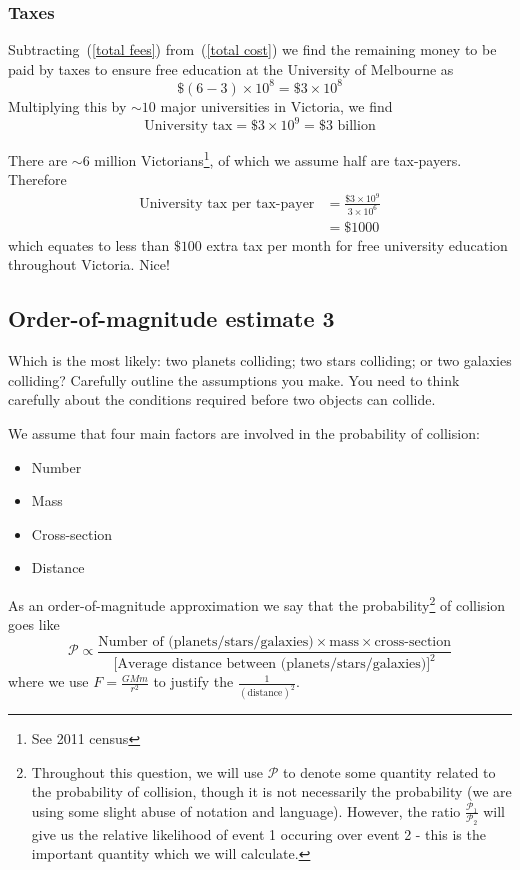\documentclass[a4paper]{article} %
\begin{document}
\subsubsection{Taxes}
Subtracting~(\ref{total fees}) from~(\ref{total cost}) we find the remaining money to be paid by taxes to ensure free education at the University of Melbourne as
\begin{equation}
\$(6-3)\times 10^8=\$3\times 10^8
\end{equation}
Multiplying this by $\sim 10$ major universities in Victoria, we find
\begin{equation}
\text{University tax}=\$3\times 10^9=\$3\text{ billion}
\end{equation}

There are $\sim 6$ million Victorians\footnote{See 2011 census}, of which we assume half are tax-payers. Therefore
\begin{align}
\text{University tax per tax-payer}&=\frac{\$3\times10^9}{3\times 10^6}\\
&=\$1000
\end{align}
which equates to less than $\$100$ extra tax per month for free university education throughout Victoria. Nice!


\subsection{Order-of-magnitude estimate 3}
\begin{framed}
Which is the most likely: two planets colliding; two stars colliding; or two galaxies colliding? Carefully outline the assumptions you make. You need to think carefully about the conditions required before two objects can collide.
\end{framed}

We assume that four main factors are involved in the probability of collision:
\begin{itemize}
\item Number
\item Mass
\item Cross-section
\item Distance
\end{itemize}

As an order-of-magnitude approximation we say that the probability\footnote{Throughout this question, we will use $\mathcal{P}$ to denote some quantity related to the probability of collision, though it is not necessarily the probability (we are using some slight abuse of notation and language). However, the ratio $\frac{\mathcal{P}_{1}}{\mathcal{P}_{2}}$ will give us the relative likelihood of event 1 occuring over event 2 - this is the important quantity which we will calculate.}
 of collision goes like
\begin{equation}
\mathcal{P}\propto \frac{\text{Number of (planets/stars/galaxies)}\times\text{mass}\times\text{cross-section}
}{\text{[Average distance between (planets/stars/galaxies)]}^2}
\end{equation}
where we use $F=\frac{GMm}{r^2}$ to justify the $\frac{1}{(\text{distance})^2}$.
\end{document}
